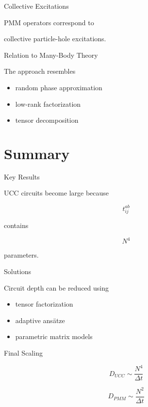 \documentclass{beamer}
\begin{document}
\begin{frame}{Collective Excitations}

  PMM operators correspond to

  collective particle-hole excitations.

\end{frame}

\begin{frame}{Relation to Many-Body Theory}

  The approach resembles

  \begin{itemize}
  \item random phase approximation
  \item low-rank factorization
  \item tensor decomposition
  \end{itemize}

\end{frame}

\section{Summary}

\begin{frame}{Key Results}

  UCC circuits become large because

  \[
  t_{ij}^{ab}
  \]

  contains

  \[
  N^4
  \]

  parameters.

\end{frame}

\begin{frame}{Solutions}

  Circuit depth can be reduced using

  \begin{itemize}
  \item tensor factorization
  \item adaptive ansätze
  \item parametric matrix models
  \end{itemize}

\end{frame}

\begin{frame}{Final Scaling}

  \[
  D_{UCC} \sim \frac{N^4}{\Delta t}
  \]

  \[
  D_{PMM} \sim \frac{N^2}{\Delta t}
  \]

\end{frame}
\end{document}
